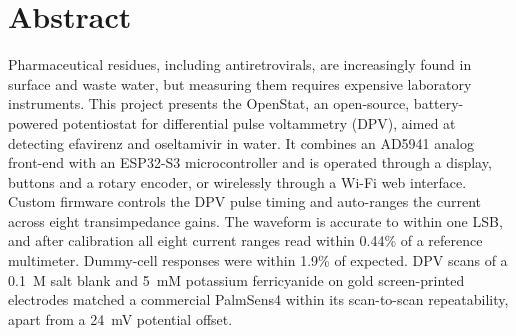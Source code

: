 \chapter*{Abstract}
\makeatletter{}\makeatother

Pharmaceutical residues, including antiretrovirals, are increasingly
found in surface and waste water, but measuring them requires expensive
laboratory instruments. This project presents the OpenStat, an open-source,
battery-powered potentiostat for differential pulse voltammetry (DPV), aimed
at detecting efavirenz and oseltamivir in water. It combines an AD5941 analog
front-end with an ESP32-S3 microcontroller and is operated
through a display, buttons and a rotary encoder, or wirelessly through a Wi-Fi
web interface. Custom firmware controls the DPV pulse timing and
auto-ranges the current across eight transimpedance gains. The waveform is
accurate to within one LSB, and after calibration all eight current
ranges read within 0.44\% of a reference multimeter. Dummy-cell responses
were within 1.9\% of expected. DPV scans of a 0.1~M salt blank
and 5~mM potassium ferricyanide on gold screen-printed electrodes matched a
commercial PalmSens4 within its scan-to-scan repeatability, apart from a
24~mV potential offset.

